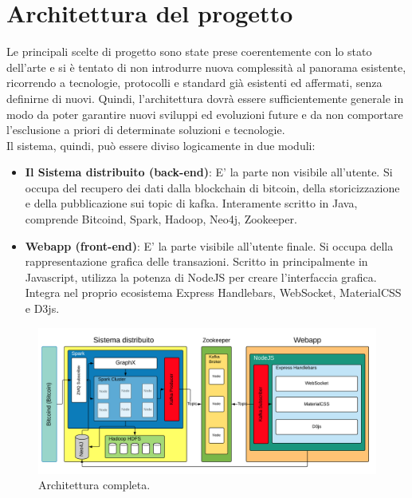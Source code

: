 \section{Architettura  del progetto}
\label{sec:architettura del progetto}
Le principali scelte di progetto sono state prese coerentemente con lo stato dell’arte e si è tentato di non introdurre nuova complessità al panorama esistente, ricorrendo a tecnologie, protocolli e standard già esistenti ed affermati, senza definirne di nuovi. Quindi, l’architettura dovrà essere sufficientemente generale in modo da poter garantire nuovi sviluppi ed evoluzioni future e da non comportare l’esclusione a priori di determinate soluzioni e tecnologie. 
\\Il sistema, quindi, può essere diviso logicamente in due moduli:
\begin{itemize}
	\item \textbf{Il Sistema distribuito (back-end)}: E' la parte non visibile all'utente. Si occupa del recupero dei dati dalla blockchain di bitcoin, della storicizzazione e della pubblicazione sui topic di kafka. Interamente scritto in Java, comprende Bitcoind, Spark, Hadoop, Neo4j, Zookeeper.
	\item \textbf{Webapp (front-end)}: E' la parte visibile all'utente finale. Si occupa della rappresentazione grafica delle transazioni. Scritto in principalmente in Javascript, utilizza la potenza di NodeJS per creare l'interfaccia grafica. Integra nel proprio ecosistema Express Handlebars, WebSocket, MaterialCSS e D3js.
\end{itemize} 

\begin{figure}[H]
	\centering
	\includegraphics[width=\textwidth]{images/architetturaTesi.png}
	\caption{Architettura completa.}
	\label{fig:softwareArchitetture}
\end{figure}

